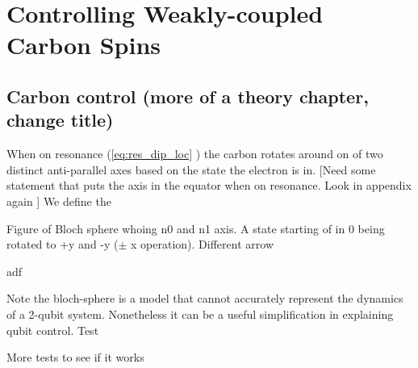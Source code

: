 \chapter{Controlling Weakly-coupled Carbon Spins}
\section{Carbon control (more of a theory chapter, change title) }
When on resonance (\cref{eq:res_dip_loc} ) the carbon rotates around on of two distinct anti-parallel axes based on the state the electron is in.
[Need some statement that puts the axis in the equator when on resonance. Look in appendix again ]
We define the

Figure of Bloch sphere whoing n0 and n1 axis.
A state starting of in 0 being rotated to +y and -y ($\pm $ x operation).
Different arrow


adf


Note the bloch-sphere is a model that cannot accurately represent the dynamics of a 2-qubit system. Nonetheless it can be a useful simplification in explaining qubit control. Test

More tests to see if it works

